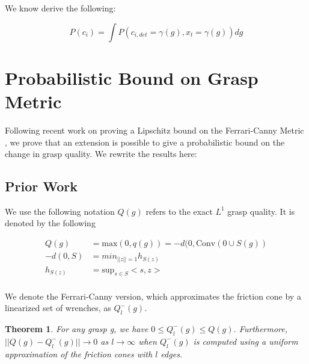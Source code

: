 \documentclass[letterpaper, 10 pt, conference]{ieeeconf}  %
\newtheorem{theorem}{Theorem}
\begin{document}
We know derive the following: 

\begin{equation}
P(c_{i}) = \int P(c_{i,det}=\gamma(g),x_t = \gamma(g)) dg
\end{equation}

\section{Probabilistic Bound on Grasp Metric}


Following recent work on proving a Lipschitz bound on the Ferrari-Canny Metric \cite{pokorny2013classical}, we prove that an extension is possible to give a probabilistic bound on the change in grasp quality.
We rewrite the results here:

\subsection{Prior Work}

We use the following notation $Q(g)$ refers to the exact $L^1$ grasp quality.
It is denoted by the following 

\begin{align}
Q(g) &= \mbox{max}(0,q(g)) = -d(0,\mbox{Conv}(0 \cup S(g))\\
-d(0,S) &= min_{||z|| = 1} h_{S(z)}\\
h_{S(z)} &= \mbox{sup}_{s\in S}<s,z>\\
\end{align}

We denote the Ferrari-Canny version, which approximates the friction cone by a linearized set of wrenches\cite{ferrari1992}, as $Q^-_l(g)$.\\

\begin{theorem}
For any grasp g, we have $0 \leq Q_l^-(g) \leq Q(g)$.
Furthermore, $||Q(g) - Q^-_l(g)|| \rightarrow 0$ as $l \rightarrow \infty$ when $Q_l^-(g)$ is computed using a uniform approximation of the friction cones with $l$ edges. \\
\end{theorem}
\end{document}
